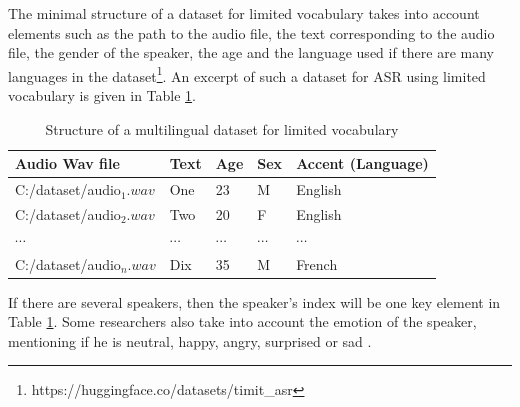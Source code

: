 The minimal structure of a dataset for limited vocabulary takes into account elements such as the path to the audio file, the text corresponding to the audio file, the gender of the speaker, the age and the language used if there are many languages in the dataset\footnote{https://huggingface.co/datasets/timit\_asr }. An excerpt of such a dataset for ASR using limited vocabulary is given in Table \ref{tab3}.
\begin{table}
\caption{Structure of a multilingual dataset for limited vocabulary}\label{tab3}
\centering
\begin{tabular}{ p{3cm} p{3cm} p{3cm} p{3cm} p{3cm} }
 \hline
 Audio Wav file&	Text&	Age&	Sex	&Accent (Language)\\
 \hline
C:/dataset/audio$_1.wav$&	One&	23	&M&	English\\
C:/dataset/audio$_2.wav$&	Two&	20&	F&	English\\
$\cdots$&$\cdots$&$\cdots$&$\cdots$&$\cdots$\\
C:/dataset/audio$_n.wav$&	Dix	&35	&M&	French\\
\hline
\end{tabular}
\end{table}
If there are several speakers, then the speaker's index will be one key element in Table \ref{tab3}. Some researchers also take into account the emotion of the speaker, mentioning if he is neutral, happy, angry, surprised or sad .

